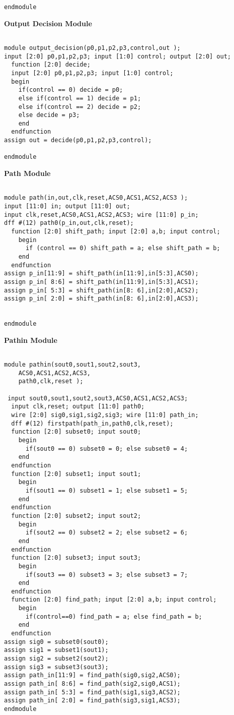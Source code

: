\documentclass[14pt]{report}
\begin{document}
{\begin{verbatim}
endmodule

\end{verbatim}
\textbf{Output Decision Module}\\
\begin{verbatim}

module output_decision(p0,p1,p2,p3,control,out );
input [2:0] p0,p1,p2,p3; input [1:0] control; output [2:0] out;
  function [2:0] decide;
  input [2:0] p0,p1,p2,p3; input [1:0] control;
  begin
    if(control == 0) decide = p0;
    else if(control == 1) decide = p1;
    else if(control == 2) decide = p2;
    else decide = p3;
    end 
  endfunction
assign out = decide(p0,p1,p2,p3,control);

endmodule

\end{verbatim}
\textbf{Path Module}\\
\begin{verbatim}

module path(in,out,clk,reset,ACS0,ACS1,ACS2,ACS3 );
input [11:0] in; output [11:0] out;
input clk,reset,ACS0,ACS1,ACS2,ACS3; wire [11:0] p_in;
dff #(12) path0(p_in,out,clk,reset);
  function [2:0] shift_path; input [2:0] a,b; input control;
    begin
      if (control == 0) shift_path = a; else shift_path = b;
    end
  endfunction
assign p_in[11:9] = shift_path(in[11:9],in[5:3],ACS0);
assign p_in[ 8:6] = shift_path(in[11:9],in[5:3],ACS1);
assign p_in[ 5:3] = shift_path(in[8: 6],in[2:0],ACS2);
assign p_in[ 2:0] = shift_path(in[8: 6],in[2:0],ACS3);


endmodule

\end{verbatim}
\textbf{Pathin Module}\\

\begin{verbatim}

module pathin(sout0,sout1,sout2,sout3,
    ACS0,ACS1,ACS2,ACS3,
    path0,clk,reset );

 input sout0,sout1,sout2,sout3,ACS0,ACS1,ACS2,ACS3;
  input clk,reset; output [11:0] path0;
  wire [2:0] sig0,sig1,sig2,sig3; wire [11:0] path_in;
  dff #(12) firstpath(path_in,path0,clk,reset);
  function [2:0] subset0; input sout0;
    begin
      if(sout0 == 0) subset0 = 0; else subset0 = 4;
    end
  endfunction
  function [2:0] subset1; input sout1;
    begin
      if(sout1 == 0) subset1 = 1; else subset1 = 5;
    end
  endfunction
  function [2:0] subset2; input sout2;
    begin
      if(sout2 == 0) subset2 = 2; else subset2 = 6;
    end
  endfunction
  function [2:0] subset3; input sout3;
    begin
      if(sout3 == 0) subset3 = 3; else subset3 = 7;
    end
  endfunction
  function [2:0] find_path; input [2:0] a,b; input control;
    begin
      if(control==0) find_path = a; else find_path = b;
    end
  endfunction
assign sig0 = subset0(sout0);
assign sig1 = subset1(sout1);
assign sig2 = subset2(sout2);
assign sig3 = subset3(sout3);
assign path_in[11:9] = find_path(sig0,sig2,ACS0);
assign path_in[ 8:6] = find_path(sig2,sig0,ACS1);
assign path_in[ 5:3] = find_path(sig1,sig3,ACS2);
assign path_in[ 2:0] = find_path(sig3,sig1,ACS3);
endmodule


\end{verbatim}}
\end{document}
